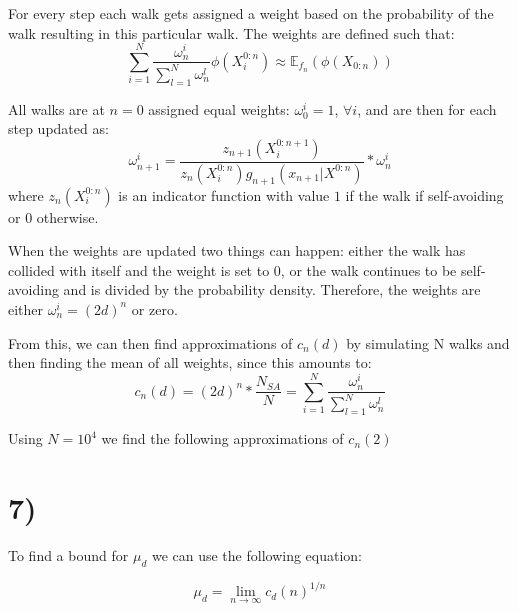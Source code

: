 \documentclass[a4paper]{article}
\begin{document}
For every step each walk gets assigned a weight based on the probability of the walk resulting in this particular walk. The weights are defined such that:
\begin{equation}
    \sum_{i = 1}^N\frac{\omega_n^i}{\sum_{l=1}^N\omega_n^l}\phi(X_i^{0:n}) \approx \mathbb{E}_{f_n}(\phi(X_{0:n})) 
\end{equation}

All walks are at $n = 0$ assigned equal weights: $\omega_0^i = 1$, $\forall i$, and are then for each step updated as:
\begin{equation}
    \label{eq:weights}
    \omega_{n+1}^i = \frac{z_{n+1}(X_i^{0:n+1})}{z_{n}(X_i^{0:n})g_{n+1}(x_{n+1}|X^{0:n})} * \omega_n^i
\end{equation}
where $z_n(X_i^{0:n})$ is an indicator function with value $1$ if the walk if self-avoiding or $0$ otherwise.

When the weights are updated two things can happen: either the walk has collided with itself and the weight is set to $0$, or the walk continues to be self-avoiding and is divided by the probability density. Therefore, the weights are either $\omega_n^i = (2d)^n$ or zero.

From this, we can then find approximations of $c_n(d)$ by simulating N walks and then finding the mean of all weights, since this amounts to:
\begin{equation}
    c_n(d) = (2d)^n*\frac{N_{SA}}{N} = \sum_{i = 1}^N\frac{\omega_n^i}{\sum_{l=1}^N\omega_n^l}
\end{equation}

Using $N = 10^4$ we find the following approximations of $c_n(2)$

\section*{7)}

 To find a bound for $\mu_d$ we can use the following equation:

\begin{equation}
    \label{eq:limit}
     \mu_d = \lim_{n \to \infty} c_d(n)^{1/n}
\end{equation}
\end{document}
